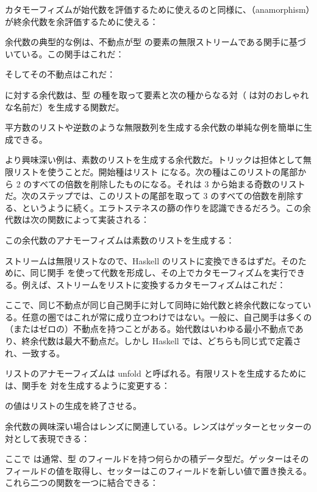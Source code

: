 カタモーフィズムが始代数を評価するために使えるのと同様に、（anamorphism）が終余代数を余評価するために使える：

余代数の典型的な例は、不動点が型  の要素の無限ストリームである関手に基づいている。この関手はこれだ：

そしてその不動点はこれだ：

 に対する余代数は、型  の種を取って要素と次の種からなる対（ は対のおしゃれな名前だ）を生成する関数だ。

平方数のリストや逆数のような無限数列を生成する余代数の単純な例を簡単に生成できる。

より興味深い例は、素数のリストを生成する余代数だ。トリックは担体として無限リストを使うことだ。開始種はリスト \code{{[}2..{]}} になる。次の種はこのリストの尾部から 2 のすべての倍数を削除したものになる。それは 3 から始まる奇数のリストだ。次のステップでは、このリストの尾部を取って 3 のすべての倍数を削除する、というように続く。エラトステネスの篩の作りを認識できるだろう。この余代数は次の関数によって実装される：

この余代数のアナモーフィズムは素数のリストを生成する：

ストリームは無限リストなので、Haskell のリストに変換できるはずだ。そのために、同じ関手  を使って代数を形成し、その上でカタモーフィズムを実行できる。例えば、ストリームをリストに変換するカタモーフィズムはこれだ：

ここで、同じ不動点が同じ自己関手に対して同時に始代数と終余代数になっている。任意の圏ではこれが常に成り立つわけではない。一般に、自己関手は多くの（またはゼロの）不動点を持つことがある。始代数はいわゆる最小不動点であり、終余代数は最大不動点だ。しかし Haskell では、どちらも同じ式で定義され、一致する。

リストのアナモーフィズムは unfold と呼ばれる。有限リストを生成するためには、関手を  対を生成するように変更する：

 の値はリストの生成を終了させる。

余代数の興味深い場合はレンズに関連している。レンズはゲッターとセッターの対として表現できる：

ここで  は通常、型  のフィールドを持つ何らかの積データ型だ。ゲッターはそのフィールドの値を取得し、セッターはこのフィールドを新しい値で置き換える。これら二つの関数を一つに結合できる：

